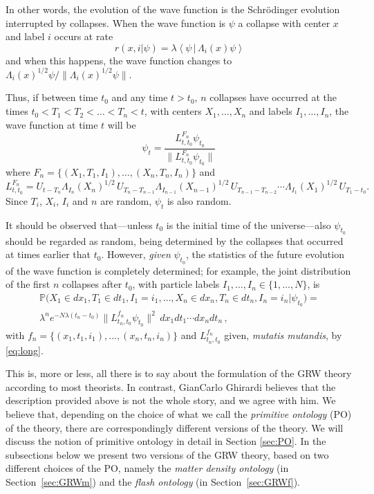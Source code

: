 \documentclass[12pt]{article}
\newcommand{\PPP}{\mathbb{P}}
\begin{document}
In other words, the evolution of the wave function is the Schr\"odinger evolution interrupted by collapses. When the wave function is 
$\psi$ a collapse with center $x$ and label $i$ occurs at rate 
\begin{equation}\label{rate}
r(x,i|\psi)=\lambda\left\langle\psi\,|\,\Lambda_{i}(x)\psi\right\rangle
\end{equation}
and when this happens, the wave function changes to $
{\Lambda_{i} (x)^{1/2}\psi}/{\| \Lambda_{i} (x)^{1/2} \psi \|}$.


Thus, if between time $t_0$ and any time $t>t_0$, $n$ collapses have occurred at the times  $t_0< T_1 < T_2 < \ldots < T_n < t $, with centers  $X_1, \ldots, X_n$ and labels $I_1, \ldots, I_n$, the wave function at time $t$ will be
\begin{equation}\label{eq:psit}
\psi_t =  \frac{L^{F_n}_{t, t_0} \psi_{t_0}
 }{\| L^{F_n}_{t, t_0} \psi_{t_0}
\|}\,
  \end{equation}
 where $F_n = \{(X_1,T_1,I_1), \ldots, (X_n,T_n,I_n)\}$ and
\begin{equation}\label{eq:long}
L^{F_n}_{t, t_0} 
= U_{t-T_n} \Lambda_{I_n}(X_n)^{1/2} \,U_{T_n-T_{n-1}} \Lambda_{I_{n-1}}(X_{n-1})^{1/2} 
  \,U_{T_{n-1}-T_{n-2}}  \cdots \Lambda_{I_1}(X_1)^{1/2} \, U_{T_1-t_0}. 
    \end{equation}
Since $T_i$, $X_i$, $I_i$ and $n$ are random, $\psi_t$ is also random.

It should be observed that---unless $t_0$ is the initial time of the universe---also $\psi_{t_0}$ should be regarded as random, being determined by the collapses that occurred at times earlier that $t_0$. However, \emph{given} $\psi_{t_0}$, the statistics of the future evolution of the wave function is completely determined; for example, the joint distribution  of the first $n$ collapses after $t_0$, with particle labels $I_1, \ldots, I_n \in \{1,\ldots,N\}$, is
\begin{multline}\label{nflashdist}
  \PPP\bigl( X_1\in d x_1, T_1 \in d t_1, I_1 = i_1, \ldots,
 X_n \in dx_n, T_n \in d t_n, I_n = i_n   |  \psi_{t_0} \bigr) =\\ 
\lambda^n  e^{-N\lambda (t_n-t_0)} \| L^{f_n}_{t_n, t_0} \psi_{t_0}
 \|^2 \, dx_{1}dt_1   \cdots  dx_{n}dt_n \,,
\end{multline}
 with $f_n = \{(x_1,t_1,i_1), \ldots, (x_n,t_n,i_n)\}$ and $L^{f_n}_{t_n, t_0}$  given, \emph{mutatis mutandis}, by \eqref{eq:long}.

\bigskip

 This is, {more or less}, all there is to say about the formulation of the {\sf GRW} theory according to most theorists. 
In contrast, GianCarlo Ghirardi believes that the description provided above is not the whole story, and we agree with him. We believe that, depending on the choice of what we call the \emph{primitive ontology} (PO) of the theory, there are correspondingly
 different versions of the theory. We will discuss the notion of primitive
 ontology in detail in Section \ref{sec:PO}.
In the subsections below we present two versions of the {\sf GRW} theory, based on two different choices of the PO, namely the \emph{matter density ontology} (in Section~\ref{sec:GRWm}) and the \emph{flash ontology} (in Section~\ref{sec:GRWf}).
\end{document}
